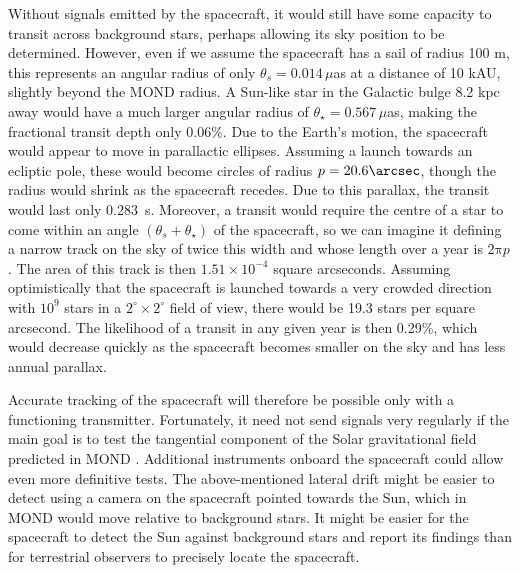 \documentclass[fleqn,usenatbib,useAMS,onecolumn]{mnras} %
\begin{document}
Without signals emitted by the spacecraft, it would still have some capacity to transit across background stars, perhaps allowing its sky position to be determined. However, even if we assume the spacecraft has a sail of radius 100 m, this represents an angular radius of only $\theta_s = 0.014 \, \mu$as at a distance of 10 kAU, slightly beyond the MOND radius. A Sun-like star in the Galactic bulge 8.2 kpc away \citep{Gravity_2019} would have a much larger angular radius of $\theta_{\star} = 0.567 \, \mu$as, making the fractional transit depth only 0.06\%. Due to the Earth's motion, the spacecraft would appear to move in parallactic ellipses. Assuming a launch towards an ecliptic pole, these would become circles of radius $p = 20.6\arcsec$, though the radius would shrink as the spacecraft recedes. Due to this parallax, the transit would last only 0.283~s. Moreover, a transit would require the centre of a star to come within an angle $\left( \theta_s + \theta_{\star} \right)$ of the spacecraft, so we can imagine it defining a narrow track on the sky of twice this width and whose length over a year is $2 \mathrm{\pi}p$. The area of this track is then $1.51 \times 10^{-4}$ square arcseconds. Assuming optimistically that the spacecraft is launched towards a very crowded direction with $10^9$ stars in a $2^\circ \times 2^\circ$ field of view, there would be 19.3 stars per square arcsecond. The likelihood of a transit in any given year is then 0.29\%, which would decrease quickly as the spacecraft becomes smaller on the sky and has less annual parallax.

Accurate tracking of the spacecraft will therefore be possible only with a functioning transmitter. Fortunately, it need not send signals very regularly if the main goal is to test the tangential component of the Solar gravitational field predicted in MOND \citep{Banik_2019_spacecraft}. Additional instruments onboard the spacecraft could allow even more definitive tests. The above-mentioned lateral drift might be easier to detect using a camera on the spacecraft pointed towards the Sun, which in MOND would move relative to background stars. It might be easier for the spacecraft to detect the Sun against background stars and report its findings than for terrestrial observers to precisely locate the spacecraft.
\end{document}
